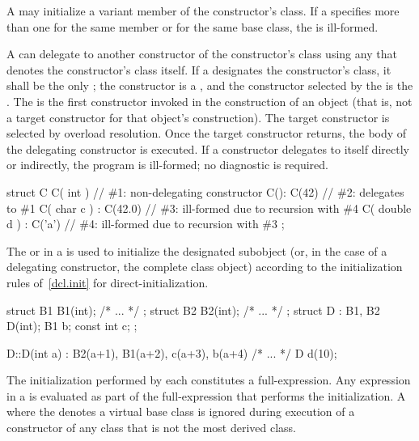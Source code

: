 \pnum
A
may initialize a variant member of the
constructor's class.
If a
specifies more than one
for the same member or for the same base class,
the
is ill-formed.

\pnum
A  can delegate to another
constructor of the constructor's class using any
 that denotes the constructor's class itself. If a
 designates the constructor's class,
it shall be the only ; the constructor
is a , and the constructor selected by the
 is the .
The  is the first constructor invoked in
the construction of an object (that is, not a target constructor for that
object's construction). The target constructor is selected by overload resolution.
Once the target constructor returns, the body of the delegating constructor
is executed. If a constructor delegates to itself directly or indirectly,
the program is ill-formed; no diagnostic is required. \enterexample

\begin{codeblock}
struct C {
  C( int ) { }                  // \#1: non-delegating constructor
  C(): C(42) { }                // \#2: delegates to \#1
  C( char c ) : C(42.0) { }     // \#3: ill-formed due to recursion with \#4
  C( double d ) : C('a') { }    // \#4: ill-formed due to recursion with \#3
};
\end{codeblock}
\exitexample

\pnum
{}%
%
The
or 
in a
is used to initialize the
designated subobject (or, in the case of a delegating constructor, the complete class object)
according to the initialization rules of~\ref{dcl.init} for direct-initialization.

\enterexample

\begin{codeblock}
struct B1 { B1(int); /* ... */ };
struct B2 { B2(int); /* ... */ };
struct D : B1, B2 {
  D(int);
  B1 b;
  const int c;
};

D::D(int a) : B2(a+1), B1(a+2), c(a+3), b(a+4)
  { /* ... */ }
D d(10);
\end{codeblock}
\exitexample
The initialization
performed by each 
constitutes a full-expression.
Any expression in
a
is evaluated as part of the full-expression that performs the initialization.
A  where the  denotes
a virtual base class is ignored during execution of a constructor of any class that is
not the most derived class.


